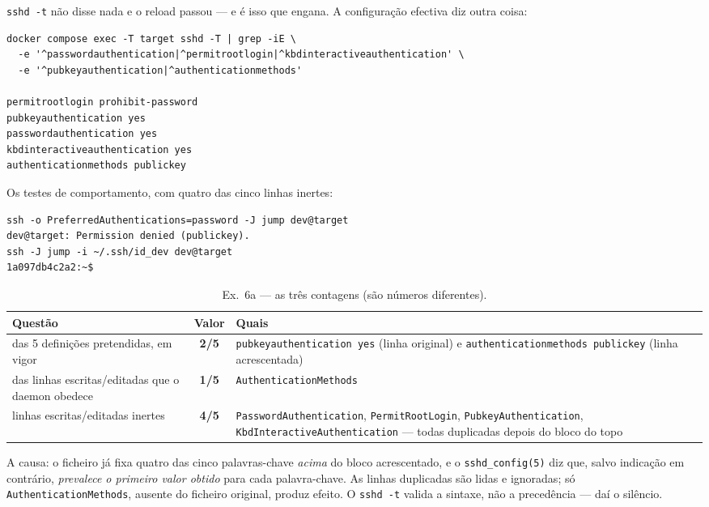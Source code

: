 \documentclass[a4paper,11pt]{article}
\newcommand{\cmd}[1]{\textcolor{sscnblue}{\texttt{#1}}}
\begin{document}
\cmd{sshd -t} n\~ao disse nada e o reload passou --- e \'e isso que engana. A
configura\c{c}\~ao efectiva diz outra coisa:

\begin{lstlisting}
docker compose exec -T target sshd -T | grep -iE \
  -e '^passwordauthentication|^permitrootlogin|^kbdinteractiveauthentication' \
  -e '^pubkeyauthentication|^authenticationmethods'

permitrootlogin prohibit-password
pubkeyauthentication yes
passwordauthentication yes
kbdinteractiveauthentication yes
authenticationmethods publickey
\end{lstlisting}

Os testes de comportamento, com quatro das cinco linhas inertes:

\begin{lstlisting}
ssh -o PreferredAuthentications=password -J jump dev@target
dev@target: Permission denied (publickey).
ssh -J jump -i ~/.ssh/id_dev dev@target
1a097db4c2a2:~$
\end{lstlisting}

\begin{table}[H]
\centering\small
\caption{Ex.\ 6a --- as tr\^es contagens (s\~ao n\'umeros diferentes).}
\begin{tabularx}{\linewidth}{@{}X c X@{}}
\toprule
\textbf{Quest\~ao} & \textbf{Valor} & \textbf{Quais} \\
\midrule
das 5 defini\c{c}\~oes pretendidas, em vigor & \textbf{2/5} &
  \cmd{pubkeyauthentication yes} (linha original) e \cmd{authenticationmethods publickey}
  (linha acrescentada) \\
das linhas escritas/editadas que o daemon obedece & \textbf{1/5} &
  \cmd{AuthenticationMethods} \\
linhas escritas/editadas inertes & \textbf{4/5} &
  \cmd{PasswordAuthentication}, \cmd{PermitRootLogin}, \cmd{PubkeyAuthentication},
  \cmd{KbdInteractiveAuthentication} --- todas duplicadas depois do bloco do topo \\
\bottomrule
\end{tabularx}
\end{table}

A causa: o ficheiro j\'a fixa quatro das cinco palavras-chave \emph{acima} do bloco
acrescentado, e o \cmd{sshd\_config(5)} diz que, salvo indica\c{c}\~ao em contr\'ario,
\emph{prevalece o primeiro valor obtido} para cada palavra-chave. As linhas duplicadas
s\~ao lidas e ignoradas; s\'o \cmd{AuthenticationMethods}, ausente do ficheiro original,
produz efeito. O \cmd{sshd -t} valida a sintaxe, n\~ao a preced\^encia --- da\'i o sil\^encio.
\end{document}
